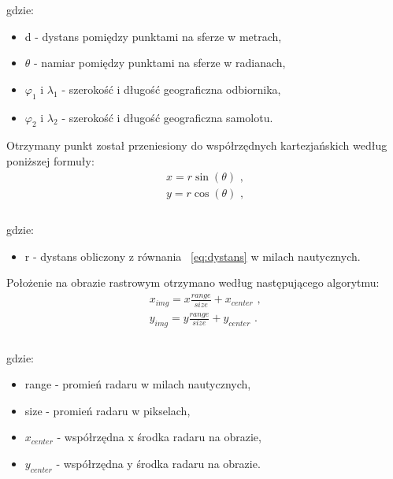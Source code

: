 \documentclass[eng,printmode]{mgr}
\begin{document}
\noindent
gdzie:
\begin{itemize}
\item d - dystans pomiędzy punktami na sferze w metrach,
\item $\theta$ - namiar pomiędzy punktami na sferze w radianach,
\item $\varphi_1$ i $\lambda_1$ - szerokość i długość geograficzna odbiornika,
\item $\varphi_2$ i $\lambda_2$ - szerokość i długość geograficzna samolotu.
\end{itemize}
\vskip 0.5cm
Otrzymany punkt został przeniesiony do współrzędnych kartezjańskich według poniższej formuły:
\begin{equation}
\renewcommand*{\arraystretch}{1.3}
\begin{array}{ll}
x = r\sin(\theta) \textrm{ ,}\\ 
y = r\cos(\theta) \textrm{ ,}\\ 
\end{array}
\end{equation}
\\


\noindent
gdzie:
\begin{itemize}
\item r - dystans obliczony z równania ~\ref{eq:dystans} w milach nautycznych.
\end{itemize}
\vskip 0.5cm
\noindent
Położenie na obrazie rastrowym otrzymano według następującego algorytmu:
\begin{equation}
\renewcommand*{\arraystretch}{1.3}
\begin{array}{ll}
x_{img} = x \frac{range}{size} + x_{center} \textrm{ ,}\\ 
y_{img} = y \frac{range}{size} + y_{center} \textrm{ .}\\ 
\end{array}
\end{equation}
\\

\noindent
gdzie:
\begin{itemize}
\item range - promień radaru w milach nautycznych,
\item size - promień radaru w pikselach,
\item $x_{center}$ - współrzędna x środka radaru na obrazie,
\item $y_{center}$ - współrzędna y środka radaru na obrazie.
\end{itemize}
\end{document}
